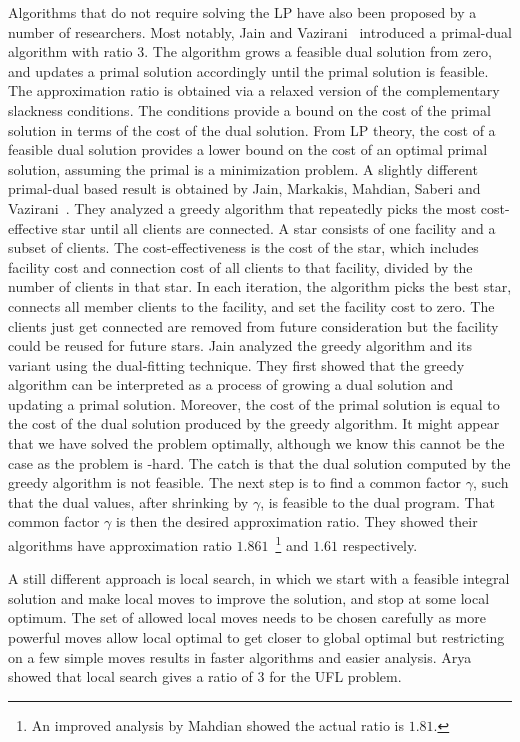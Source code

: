 \documentclass[oneside,final]{ucr}
\begin{document}
Algorithms that do not require solving the LP have also been
proposed by a number of researchers. Most notably, Jain and
Vazirani~\cite{JainV01} introduced a primal-dual algorithm
with ratio $3$. The algorithm grows a feasible dual solution
from zero, and updates a primal solution accordingly until
the primal solution is feasible. The approximation ratio is
obtained via a relaxed version of the complementary
slackness conditions. The conditions provide a bound on the
cost of the primal solution in terms of the cost of the dual
solution. From LP theory, the cost of a feasible dual
solution provides a lower bound on the cost of an optimal
primal solution, assuming the primal is a minimization
problem. A slightly different primal-dual based result is
obtained by Jain, Markakis, Mahdian, Saberi and
Vazirani~\cite{JainMMSV03}. They analyzed a greedy algorithm
that repeatedly picks the most cost-effective star until all
clients are connected. A star consists of one facility and a
subset of clients. The cost-effectiveness is the cost of the
star, which includes facility cost and connection cost of
all clients to that facility, divided by the number of
clients in that star. In each iteration, the algorithm picks
the best star, connects all member clients to the facility,
and set the facility cost to zero. The clients just get
connected are removed from future consideration but the
facility could be reused for future stars. Jain {\etal}
analyzed the greedy algorithm and its variant using the
dual-fitting technique. They first showed that the greedy
algorithm can be interpreted as a process of growing a dual
solution and updating a primal solution. Moreover, the cost
of the primal solution is equal to the cost of the dual
solution produced by the greedy algorithm. It might appear
that we have solved the {\UFL} problem optimally, although
we know this cannot be the case as the {\UFL} problem is
{\NP}-hard. The catch is that the dual solution computed by
the greedy algorithm is not feasible. The next step is to
find a common factor $\gamma$, such that the dual values,
after shrinking by $\gamma$, is feasible to the dual
program. That common factor $\gamma$ is then the desired
approximation ratio. They showed their algorithms have
approximation ratio $1.861$~\footnote{An improved analysis
  by Mahdian showed the actual ratio is $1.81$.} and $1.61$
respectively.

A still different approach is local search, in which we
start with a feasible integral solution and make local moves
to improve the solution, and stop at some local optimum. The
set of allowed local moves needs to be chosen carefully as
more powerful moves allow local optimal to get closer to
global optimal but restricting on a few simple moves results
in faster algorithms and easier analysis. Arya
{\etal}~\cite{AryaGKMMP01} showed that local search gives a
ratio of $3$ for the UFL problem.
\end{document}
